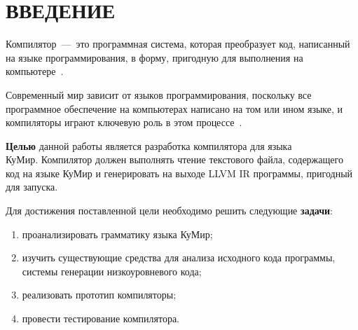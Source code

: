\section*{ВВЕДЕНИЕ}
{}
 
Компилятор~---~это программная система, которая преобразует код, написанный на языке программирования, в форму, пригодную для выполнения на компьютере~\cite{aho2003}. 

Современный мир зависит от языков программирования, поскольку все программное обеспечение на компьютерах написано на том или ином языке, и компиляторы играют ключевую роль в этом процессе~\cite{aho2003}.

\textbf{Целью} данной работы является разработка компилятора для языка\\КуМир. Компилятор должен выполнять чтение текстового файла, содержащего код на языке КуМир и генерировать на выходе LLVM IR программы, пригодный для запуска.

Для достижения поставленной цели необходимо решить следующие \textbf{задачи}:
\begin{enumerate}
	\item проанализировать грамматику языка КуМир;
	\item изучить существующие средства для анализа исходного кода программы, системы генерации низкоуровневого кода;
	\item реализовать прототип компиляторы;
	\item провести тестирование компилятора.
\end{enumerate}


\newpage